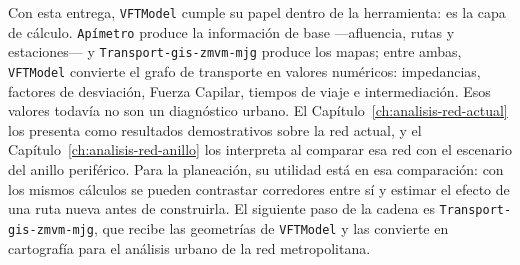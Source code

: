 Con esta entrega, \texttt{VFTModel} cumple su papel dentro de la herramienta: es la capa
de cálculo. \texttt{Apímetro} produce la información de base ---afluencia, rutas y
estaciones--- y \texttt{Transport-gis-zmvm-mjg} produce los mapas; entre ambas, \texttt{VFTModel}
convierte el grafo de transporte en valores numéricos: impedancias, factores de
desviación, Fuerza Capilar, tiempos de viaje e intermediación. Esos valores
todavía no son un diagnóstico urbano. El Capítulo~\ref{ch:analisis-red-actual}
los presenta como resultados demostrativos sobre la red actual, y el
Capítulo~\ref{ch:analisis-red-anillo} los interpreta al comparar esa red con el
escenario del anillo periférico. Para la planeación, su utilidad está en esa
comparación: con los mismos cálculos se pueden contrastar corredores entre sí y
estimar el efecto de una ruta nueva antes de construirla. El siguiente paso de
la cadena es \texttt{Transport-gis-zmvm-mjg}, que recibe las geometrías de \texttt{VFTModel} y
las convierte en cartografía para el análisis urbano de la red metropolitana.
